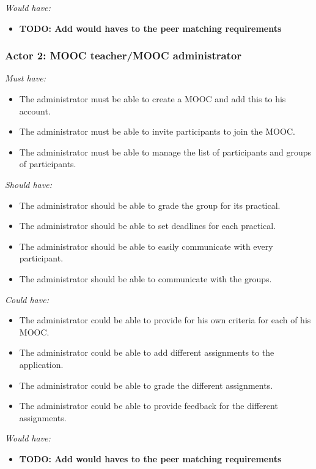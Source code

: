 \documentclass[]{article}
\newcommand{\TODO}[1]{{\color{red}\textbf{TODO: #1}}}
\begin{document}
\emph{Would have:}
\begin{itemize}
\item \TODO{Add would haves to the peer matching requirements}
\end{itemize}

\subsubsection{Actor 2: MOOC teacher/MOOC administrator}
\emph{Must have:}
\begin{itemize}
\item The administrator must be able to create a MOOC and add this to his account.
\item The administrator must be able to invite participants to join the MOOC.
\item The administrator must be able to manage the list of participants and groups of participants.
\end{itemize}

\emph{Should have:}
\begin{itemize}
\item The administrator should be able to grade the group for its practical.
\item The administrator should be able to set deadlines for each practical.
\item The administrator should be able to easily communicate with every participant.
\item The administrator should be able to communicate with the groups.
\end{itemize}

\emph{Could have:}
\begin{itemize}
\item The administrator could be able to provide for his own criteria for each of his MOOC.
\item The administrator could be able to add different assignments to the application.
\item The administrator could be able to grade the different assignments.
\item The administrator could be able to provide feedback for the different assignments.
\end{itemize}

\emph{Would have:}
\begin{itemize}
\item \TODO{Add would haves to the peer matching requirements}
\end{itemize}
\end{document}
